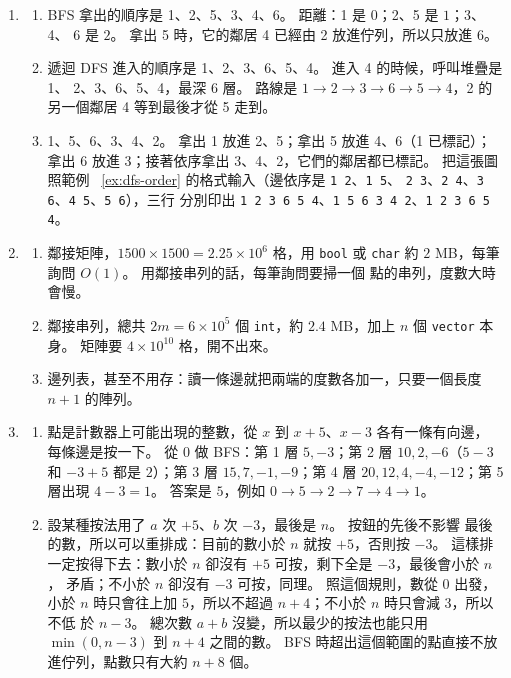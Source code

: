 \begin{enumerate}
\item
\begin{enumerate}
\item BFS 拿出的順序是 1、2、5、3、4、6。 距離：1 是 $0$；2、5 是 $1$；3、4、
6 是 $2$。 拿出 5 時，它的鄰居 4 已經由 2 放進佇列，所以只放進 6。
\item 遞迴 DFS 進入的順序是 1、2、3、6、5、4。 進入 4 的時候，呼叫堆疊是 1、
2、3、6、5、4，最深 $6$ 層。 路線是 $1 \to 2 \to 3 \to 6 \to 5 \to 4$，2 的
另一個鄰居 4 等到最後才從 5 走到。
\item 1、5、6、3、4、2。 拿出 1 放進 2、5；拿出 5 放進 4、6（1 已標記）；拿出
6 放進 3；接著依序拿出 3、4、2，它們的鄰居都已標記。 把這張圖照範例
~\ref{ex:dfs-order} 的格式輸入（邊依序是 \texttt{1 2}、\texttt{1 5}、
\texttt{2 3}、\texttt{2 4}、\texttt{3 6}、\texttt{4 5}、\texttt{5 6}），三行
分別印出 \texttt{1 2 3 6 5 4}、\texttt{1 5 6 3 4 2}、\texttt{1 2 3 6 5 4}。
\end{enumerate}

\item
\begin{enumerate}
\item 鄰接矩陣，$1500 \times 1500 = 2.25 \times 10^6$ 格，用 \texttt{bool} 或
\texttt{char} 約 $2$ MB，每筆詢問 $O(1)$。 用鄰接串列的話，每筆詢問要掃一個
點的串列，度數大時會慢。
\item 鄰接串列，總共 $2m = 6 \times 10^5$ 個 \texttt{int}，約 $2.4$ MB，加上
$n$ 個 \texttt{vector} 本身。 矩陣要 $4 \times 10^{10}$ 格，開不出來。
\item 邊列表，甚至不用存：讀一條邊就把兩端的度數各加一，只要一個長度 $n + 1$
的陣列。
\end{enumerate}

\item
\begin{enumerate}
\item 點是計數器上可能出現的整數，從 $x$ 到 $x + 5$、$x - 3$ 各有一條有向邊，
每條邊是按一下。 從 $0$ 做 BFS：第 1 層 $5, -3$；第 2 層 $10, 2, -6$（$5 - 3$
和 $-3 + 5$ 都是 $2$）；第 3 層 $15, 7, -1, -9$；第 4 層 $20, 12, 4, -4,
-12$；第 5 層出現 $4 - 3 = 1$。 答案是 $5$，例如
$0 \to 5 \to 2 \to 7 \to 4 \to 1$。
\item 設某種按法用了 $a$ 次 $+5$、$b$ 次 $-3$，最後是 $n$。 按鈕的先後不影響
最後的數，所以可以重排成：目前的數小於 $n$ 就按 $+5$，否則按 $-3$。 這樣排
一定按得下去：數小於 $n$ 卻沒有 $+5$ 可按，剩下全是 $-3$，最後會小於 $n$，
矛盾；不小於 $n$ 卻沒有 $-3$ 可按，同理。 照這個規則，數從 $0$ 出發，小於
$n$ 時只會往上加 $5$，所以不超過 $n + 4$；不小於 $n$ 時只會減 $3$，所以不低
於 $n - 3$。 總次數 $a + b$ 沒變，所以最少的按法也能只用 $\min(0, n - 3)$ 到
$n + 4$ 之間的數。 BFS 時超出這個範圍的點直接不放進佇列，點數只有大約
$n + 8$ 個。
\end{enumerate}


\end{enumerate}
